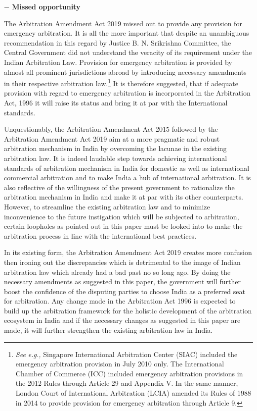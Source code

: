 \begin{multicols}{2}
\noi
{\large \bfseries $-$ Missed opportunity}

\noi
The Arbitration Amendment Act 2019 missed out to provide any provision for emergency
arbitration. It is all the more important that despite an unambiguous recommendation in this
regard by Justice B. N. Srikrishna Committee, the Central Government did not understand the
veracity of its requirement under the Indian Arbitration Law. Provision for emergency
arbitration is provided by almost all prominent jurisdictions abroad by introducing necessary
amendments in their respective arbitration law.\footnote{\textit{See e.g.,} Singapore International Arbitration Center (SIAC) included the emergency arbitration provision in July 2010 only. The International Chamber of Commerce (ICC) included emergency arbitration provisions in the 2012 Rules through Article 29 and Appendix V. In the same manner, London Court of International
Arbitration (LCIA) amended its Rules of 1988 in 2014 to provide provision for emergency arbitration through
Article 9.} It is therefore suggested, that if adequate
provision with regard to emergency arbitration is incorporated in the Arbitration Act, 1996 it
will raise its status and bring it at par with the International standards.


\noi
Unquestionably, the Arbitration Amendment Act 2015 followed by the Arbitration
Amendment Act 2019 aim at a more pragmatic and robust arbitration mechanism in India by
overcoming the lacunae in the existing arbitration law. It is indeed laudable step towards
achieving international standards of arbitration mechanism in India for domestic as well as
international commercial arbitration and to make India a hub of international arbitration. It is
also reflective of the willingness of the present government to rationalize the arbitration
mechanism in India and make it at par with its other counterparts. However, to streamline the
existing arbitration law and to minimize inconvenience to the future instigation which will be
subjected to arbitration, certain loopholes as pointed out in this paper must be looked into to
make the arbitration process in line with the international best practices.

\noi
In its existing form, the Arbitration Amendment Act 2019 creates more confusion then
ironing out the discrepancies which is detrimental to the image of Indian arbitration law which already had a bad past no so long ago. By doing the necessary amendments as
suggested in this paper, the government will further boost the confidence of the disputing
parties to choose India as a preferred seat for arbitration. Any change made in the Arbitration
Act 1996 is expected to build up the arbitration framework for the holistic development of the
arbitration ecosystem in India and if the necessary changes as suggested in this paper are
made, it will further strengthen the existing arbitration law in India.
\end{multicols}

